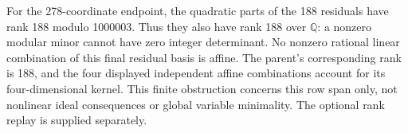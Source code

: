 For the 278-coordinate endpoint, the quadratic parts of the 188 residuals
have rank 188 modulo 1000003.  Thus they also have rank 188 over
$\mathbb Q$: a nonzero modular minor cannot have zero integer
determinant.  No nonzero rational linear combination of this final
residual basis is affine.  The parent's corresponding rank is 188, and
the four displayed independent affine combinations account for its
four-dimensional kernel.  This finite obstruction concerns this row
span only, not nonlinear ideal consequences or global variable
minimality.  The optional rank replay is supplied separately.
